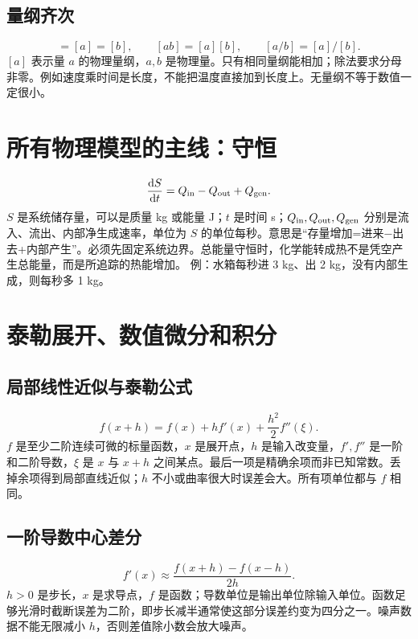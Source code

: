 \documentclass[UTF8,zihao=-4,openany,oneside,fontset=windows]{ctexbook}
\begin{document}
\subsection{量纲齐次}
\begin{equation}[a+b]=[a]=[b],\qquad [ab]=[a][b],\qquad [a/b]=[a]/[b].\end{equation}
$[a]$ 表示量 $a$ 的物理量纲，$a,b$ 是物理量。只有相同量纲能相加；除法要求分母非零。例如速度乘时间是长度，不能把温度直接加到长度上。无量纲不等于数值一定很小。

\section{所有物理模型的主线：守恒}
\begin{equation}\frac{\mathrm d S}{\mathrm dt}=Q_{\rm in}-Q_{\rm out}+Q_{\rm gen}.\end{equation}
$S$ 是系统储存量，可以是质量 kg 或能量 J；$t$ 是时间 s；$Q_{\rm in},Q_{\rm out},Q_{\rm gen}$ 分别是流入、流出、内部净生成速率，单位为 $S$ 的单位每秒。意思是“存量增加=进来−出去+内部产生”。必须先固定系统边界。总能量守恒时，化学能转成热不是凭空产生总能量，而是所追踪的热能增加。
例：水箱每秒进 3 kg、出 2 kg，没有内部生成，则每秒多 1 kg。

\section{泰勒展开、数值微分和积分}
\subsection{局部线性近似与泰勒公式}
\begin{equation}f(x+h)=f(x)+hf'(x)+\frac{h^2}{2}f''(\xi).\end{equation}
$f$ 是至少二阶连续可微的标量函数，$x$ 是展开点，$h$ 是输入改变量，$f',f''$ 是一阶和二阶导数，$\xi$ 是 $x$ 与 $x+h$ 之间某点。最后一项是精确余项而非已知常数。丢掉余项得到局部直线近似；$h$ 不小或曲率很大时误差会大。所有项单位都与 $f$ 相同。
\subsection{一阶导数中心差分}
\begin{equation}f'(x)\approx\frac{f(x+h)-f(x-h)}{2h}.\end{equation}
$h>0$ 是步长，$x$ 是求导点，$f$ 是函数；导数单位是输出单位除输入单位。函数足够光滑时截断误差为二阶，即步长减半通常使这部分误差约变为四分之一。噪声数据不能无限减小 $h$，否则差值除小数会放大噪声。
\end{document}
